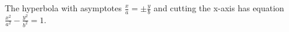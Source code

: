  The hyperbola with asymptotes $  \frac{x}{a} = \pm \frac{y}{b} $
and cutting the x-axis
has equation $ \frac{x^2}{a^2} - \frac{y^2}{b^2} = 1 . $
